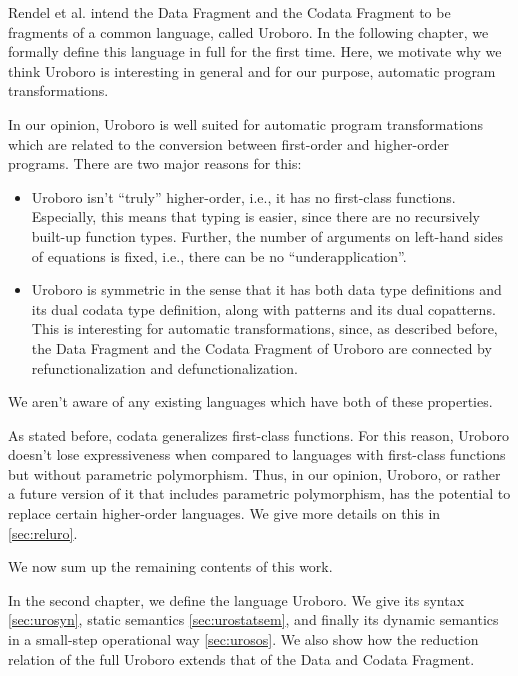 Rendel et al. intend the Data Fragment and the Codata Fragment to be fragments of a common language, called Uroboro. In the following chapter, we formally define this language in full for the first time. Here, we motivate why we think Uroboro is interesting in general and for our purpose, automatic program transformations.

In our opinion, Uroboro is well suited for automatic program transformations which are related to the conversion between first-order and higher-order programs. There are two major reasons for this:
\begin{itemize}
\item Uroboro isn't ``truly'' higher-order, i.e., it has no first-class functions. Especially, this means that typing is easier, since there are no recursively built-up function types. Further, the number of arguments on left-hand sides of equations is fixed, i.e., there can be no ``underapplication''.

\item Uroboro is symmetric in the sense that it has both data type definitions and its dual codata type definition, along with patterns and its dual copatterns. This is interesting for automatic transformations, since, as described before, the Data Fragment and the Codata Fragment of Uroboro are connected by refunctionalization and defunctionalization.
\end{itemize}
We aren't aware of any existing languages which have both of these properties.

As stated before, codata generalizes first-class functions. For this reason, Uroboro doesn't lose expressiveness when compared to languages with first-class functions but without parametric polymorphism. Thus, in our opinion, Uroboro, or rather a future version of it that includes parametric polymorphism, has the potential to replace certain higher-order languages. We give more details on this in \autoref{sec:reluro}.

We now sum up the remaining contents of this work.

In the second chapter, we define the language Uroboro. We give its syntax \autoref{sec:urosyn}, static semantics \autoref{sec:urostatsem}, and finally its dynamic semantics in a small-step operational way \autoref{sec:urosos}. We also show how the reduction relation of the full Uroboro extends that of the Data and Codata Fragment.

